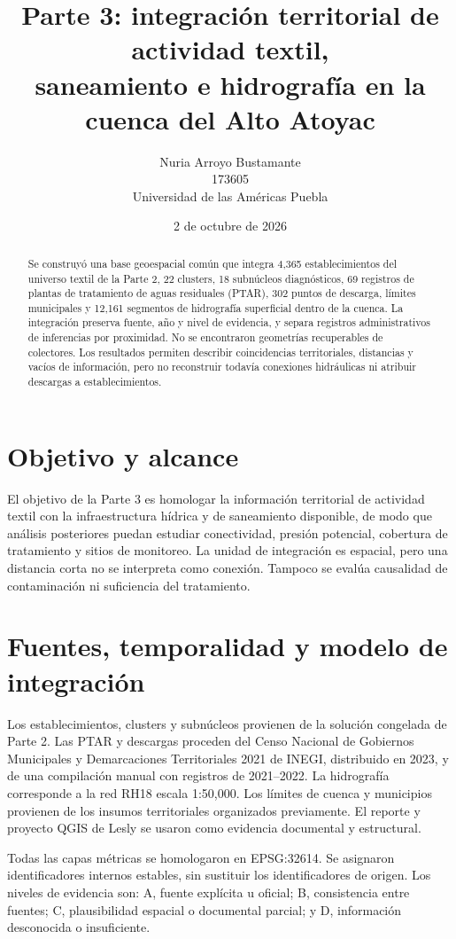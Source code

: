 \documentclass[11pt,letterpaper]{article}
\title{Parte 3: integración territorial de actividad textil,\\saneamiento e hidrografía en la cuenca del Alto Atoyac}
\author{Nuria Arroyo Bustamante\\173605\\Universidad de las Américas Puebla}
\date{2 de octubre de 2026}
\begin{document}
\maketitle
\begin{abstract}
Se construyó una base geoespacial común que integra 4,365 establecimientos del universo textil de la Parte 2, 22 clusters, 18 subnúcleos diagnósticos, 69 registros de plantas de tratamiento de aguas residuales (PTAR), 302 puntos de descarga, límites municipales y 12,161 segmentos de hidrografía superficial dentro de la cuenca. La integración preserva fuente, año y nivel de evidencia, y separa registros administrativos de inferencias por proximidad. No se encontraron geometrías recuperables de colectores. Los resultados permiten describir coincidencias territoriales, distancias y vacíos de información, pero no reconstruir todavía conexiones hidráulicas ni atribuir descargas a establecimientos.
\end{abstract}
\tableofcontents

\section{Objetivo y alcance}
El objetivo de la Parte 3 es homologar la información territorial de actividad textil con la infraestructura hídrica y de saneamiento disponible, de modo que análisis posteriores puedan estudiar conectividad, presión potencial, cobertura de tratamiento y sitios de monitoreo. La unidad de integración es espacial, pero una distancia corta no se interpreta como conexión. Tampoco se evalúa causalidad de contaminación ni suficiencia del tratamiento.

\section{Fuentes, temporalidad y modelo de integración}
Los establecimientos, clusters y subnúcleos provienen de la solución congelada de Parte 2. Las PTAR y descargas proceden del Censo Nacional de Gobiernos Municipales y Demarcaciones Territoriales 2021 de INEGI, distribuido en 2023, y de una compilación manual con registros de 2021--2022. La hidrografía corresponde a la red RH18 escala 1:50,000. Los límites de cuenca y municipios provienen de los insumos territoriales organizados previamente. El reporte y proyecto QGIS de Lesly se usaron como evidencia documental y estructural.

Todas las capas métricas se homologaron en EPSG:32614. Se asignaron identificadores internos estables, sin sustituir los identificadores de origen. Los niveles de evidencia son: A, fuente explícita u oficial; B, consistencia entre fuentes; C, plausibilidad espacial o documental parcial; y D, información desconocida o insuficiente.
\end{document}
